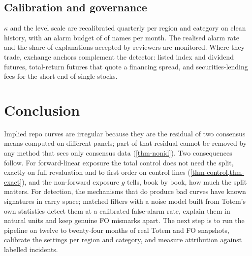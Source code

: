 \subsection{Calibration and governance}
$\kappa$ and the level scale are recalibrated quarterly per region and category on clean history, with an alarm budget
of \vFPR{} of names per month. The realised alarm rate and the share of explanations accepted by reviewers are
monitored. Where they trade, exchange anchors complement the detector: listed index and dividend futures, total-return
futures that quote a financing spread, and securities-lending fees for the short end of single stocks.

\section{Conclusion}
Implied repo curves are irregular because they are the residual of two consensus means computed on different panels;
part of that residual cannot be removed by any method that sees only consensus data (\cref{thm-nonid}). Two
consequences follow. For forward-linear exposure the total control does not need the split, exactly on full revaluation
and to first order on control lines (\cref{thm-control,thm-exact}), and the non-forward exposure $g$ tells, book by book,
how much the split matters. For detection, the mechanisms that do produce bad curves have known signatures in carry space;
matched filters with a noise model built from Totem's own statistics detect them at a calibrated false-alarm rate,
explain them in natural units and keep genuine FO mismarks apart. The next step is to run the pipeline on twelve to
twenty-four months of real Totem and FO snapshots, calibrate the settings per region and category, and measure
attribution against labelled incidents.
